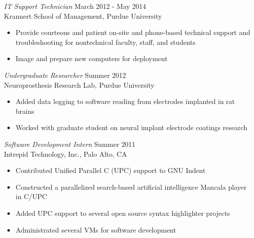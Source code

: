 \documentclass[margin,5pt]{res} %
\begin{document}
\begin{resume}
	     {\sl IT Support Technician} \hfill March 2012 - May 2014 \\
                Krannert School of Management, Purdue University
                \begin{itemize} \itemsep -2pt
                \item Provide courteous and patient on-site and phone-based technical support and troubleshooting for nontechnical faculty, staff, and students
                \item Image and prepare new computers for deployment
	     \end{itemize}

	     {\sl Undergraduate Researcher} \hfill Summer 2012\\
                Neuroprosthesis Research Lab, Purdue University
	     \begin{itemize} \itemsep -2pt
	     \item Added data logging to software reading from electrodes implanted in rat brains
	     \item Worked with graduate student on neural implant electrode coatings research
	     \end{itemize}

	     {\sl Software Development Intern} \hfill Summer 2011\\
                Intrepid Technology, Inc., Palo Alto, CA
                 \begin{itemize}  \itemsep -2pt
                 \item Contributed Unified Parallel C (UPC) support to GNU Indent
	     	\item Constructed a parallelized search-based artificial intelligence Mancala player in C/UPC
                 \item Added UPC support to several open source syntax highlighter projects
                 \item Administrated several VMs for software development
                 \end{itemize}




\end{resume}
\end{document}
